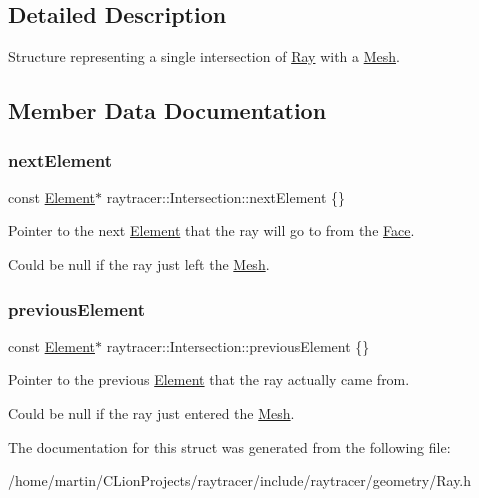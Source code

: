 \subsection{Detailed Description}
Structure representing a single intersection of \hyperlink{classraytracer_1_1Ray}{Ray} with a \hyperlink{classraytracer_1_1Mesh}{Mesh}. 

\subsection{Member Data Documentation}
\mbox{\label{structraytracer_1_1Intersection_afb09dd39bcd8d80373b47e36ba66fcf5}} 
\subsubsection{\texorpdfstring{next\+Element}{nextElement}}
{\footnotesize\ttfamily const \hyperlink{classraytracer_1_1Element}{Element}$\ast$ raytracer\+::\+Intersection\+::next\+Element \{\}}



Pointer to the next \hyperlink{classraytracer_1_1Element}{Element} that the ray will go to from the \hyperlink{classraytracer_1_1Face}{Face}. 

Could be null if the ray just left the \hyperlink{classraytracer_1_1Mesh}{Mesh}. \mbox{\label{structraytracer_1_1Intersection_aa4f4ef637299868b38290af358031832}} 
\subsubsection{\texorpdfstring{previous\+Element}{previousElement}}
{\footnotesize\ttfamily const \hyperlink{classraytracer_1_1Element}{Element}$\ast$ raytracer\+::\+Intersection\+::previous\+Element \{\}}



Pointer to the previous \hyperlink{classraytracer_1_1Element}{Element} that the ray actually came from. 

Could be null if the ray just entered the \hyperlink{classraytracer_1_1Mesh}{Mesh}. 

The documentation for this struct was generated from the following file\+:\begin{DoxyCompactItemize}
\item 
/home/martin/\+C\+Lion\+Projects/raytracer/include/raytracer/geometry/Ray.\+h\end{DoxyCompactItemize}
